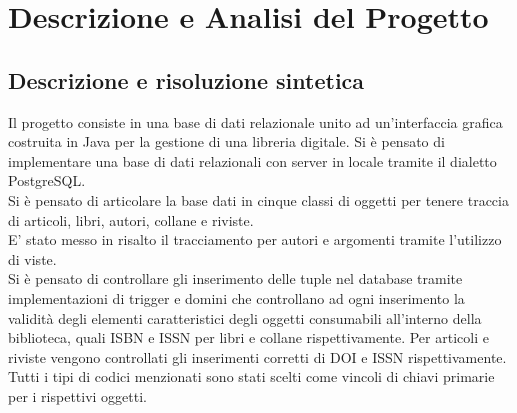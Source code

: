 \chapter{Descrizione e Analisi del Progetto}

\section{Descrizione e risoluzione sintetica}

	Il progetto consiste in una base di dati relazionale unito ad un'interfaccia grafica costruita in Java per la gestione di una libreria digitale. Si è pensato di implementare una base di dati relazionali con server in locale tramite il dialetto PostgreSQL.\\
	
	
	Si è pensato di articolare la base dati in cinque classi di oggetti per tenere traccia di articoli, libri, autori, collane e riviste. \\ 
	
	E' stato messo in risalto il tracciamento per autori e argomenti tramite l'utilizzo di viste.\\ 
	
	Si è pensato di controllare gli inserimento delle tuple nel database tramite implementazioni di trigger e domini che controllano ad ogni inserimento la validità degli elementi caratteristici degli oggetti consumabili all'interno della biblioteca, quali ISBN e ISSN per libri e collane rispettivamente. Per articoli e riviste vengono controllati gli inserimenti corretti di DOI e ISSN rispettivamente. \\
	
	Tutti i tipi di codici menzionati sono stati scelti come vincoli di chiavi primarie per i rispettivi oggetti.